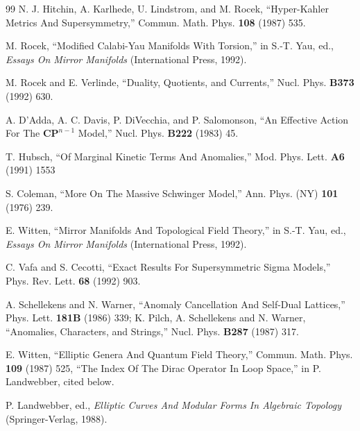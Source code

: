 \begin{thebibliography}{99}
 N. J. Hitchin, A. Karlhede, U. Lindstrom, and M. Rocek, ``Hyper-Kahler Metrics And Supersymmetry,'' Commun. Math. Phys. \textbf{108} (1987) 535.

\label{op:89}
 M. Rocek, ``Modified Calabi-Yau Manifolds With Torsion,'' in S.-T. Yau, ed., \textit{Essays On Mirror Manifolds} (International Press, 1992).

 M. Rocek and E. Verlinde, ``Duality, Quotients, and Currents,'' Nucl. Phys. \textbf{B373} (1992) 630.

 A. D'Adda, A. C. Davis, P. DiVecchia, and P. Salomonson, ``An Effective Action For The $\mathbf{CP}^{n-1}$ Model,'' Nucl. Phys. \textbf{B222} (1983) 45.

 T. Hubsch, ``Of Marginal Kinetic Terms And Anomalies,'' Mod. Phys. Lett. \textbf{A6} (1991) 1553

 S. Coleman, ``More On The Massive Schwinger Model,'' Ann. Phys. (NY) \textbf{101} (1976) 239.

 E. Witten, ``Mirror Manifolds And Topological Field Theory,'' in S.-T. Yau, ed., \textit{Essays On Mirror Manifolds} (International Press, 1992).

 C. Vafa and S. Cecotti, ``Exact Results For Supersymmetric Sigma Models,'' Phys. Rev. Lett. \textbf{68} (1992) 903.

 A. Schellekens and N. Warner, ``Anomaly Cancellation And Self-Dual Lattices,'' Phys. Lett. \textbf{181B} (1986) 339; K. Pilch, A. Schellekens and N. Warner, ``Anomalies, Characters, and Strings,'' Nucl. Phys. \textbf{B287} (1987) 317.

 E. Witten, ``Elliptic Genera And Quantum Field Theory,'' Commun. Math. Phys. \textbf{109} (1987) 525, ``The Index Of The Dirac Operator In Loop Space,'' in P. Landwebber, cited below.

 P. Landwebber, ed., \textit{Elliptic Curves And Modular Forms In Algebraic Topology} (Springer-Verlag, 1988).


\end{thebibliography}
